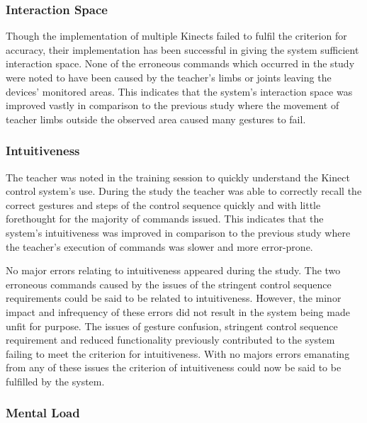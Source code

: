 \documentclass[link]{IWCOMP}
\begin{document}
\subsubsection{Interaction Space}
\label{sec:discussionResolutionInteractionSpace}

Though the implementation of multiple Kinects failed to fulfil the criterion for accuracy, their implementation has been successful in giving the system sufficient interaction space.
None of the erroneous commands which occurred in the study were noted to have been caused by the teacher's limbs or joints leaving the devices' monitored areas.
This indicates that the system's interaction space was improved vastly in comparison to the previous study where the movement of teacher limbs outside the observed area caused many gestures to fail.

\subsubsection{Intuitiveness}
\label{sec:discussionResolutionIntuitiveness}

The teacher was noted in the training session to quickly understand the Kinect control system's use.
During the study the teacher was able to correctly recall the correct gestures and steps of the control sequence quickly and with little forethought for the majority of commands issued.
This indicates that the system's intuitiveness was improved in comparison to the previous study where the teacher's execution of commands was slower and more error-prone.

No major errors relating to intuitiveness appeared during the study.
The two erroneous commands caused by the issues of the stringent control sequence requirements could be said to be related to intuitiveness.
However, the minor impact and infrequency of these errors did not result in the system being made unfit for purpose.
The issues of gesture confusion, stringent control sequence requirement and reduced functionality previously contributed to the system failing to meet the criterion for intuitiveness.
With no majors errors emanating from any of these issues the criterion of intuitiveness could now be said to be fulfilled by the system.

\subsubsection{Mental Load}
\label{sec:discussionResolutionMentalLoad}
\end{document}
